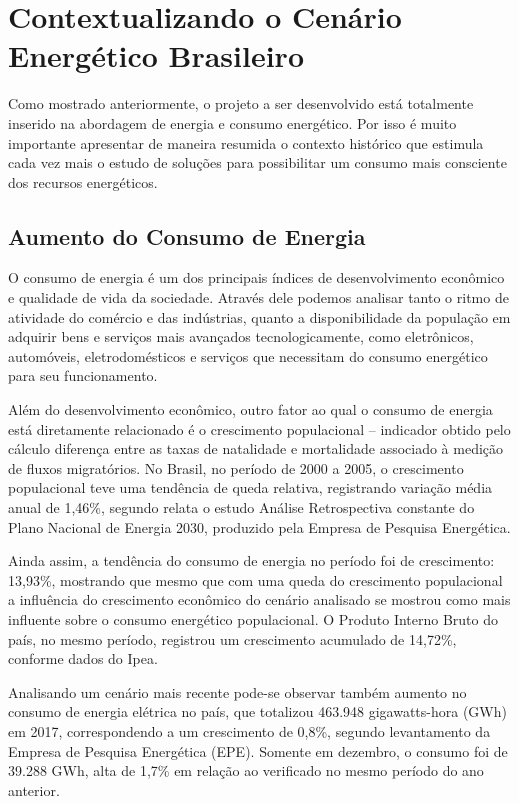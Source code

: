 \chapter{Contextualizando o Cenário Energético Brasileiro}
\label{c:contextualizando_o_cenario_energetico_brasileiro}

Como mostrado anteriormente, o projeto a ser desenvolvido está totalmente inserido
na abordagem de energia e consumo energético. Por isso é muito importante apresentar de maneira resumida o contexto histórico que estimula cada vez mais o estudo de soluções para possibilitar um consumo mais consciente dos recursos energéticos. 

\section{Aumento do Consumo de Energia}
O consumo de energia é um dos principais índices de
desenvolvimento econômico e qualidade de vida
da sociedade. Através dele podemos analisar tanto o ritmo de atividade
do comércio e das indústrias, quanto a
disponibilidade da população em adquirir bens e serviços
mais avançados tecnologicamente, como eletrônicos, automóveis, eletrodomésticos e serviços que necessitam do consumo energético para seu funcionamento.

Além do desenvolvimento econômico, outro fator ao qual o consumo de energia está diretamente relacionado é o crescimento populacional – indicador obtido pelo cálculo diferença entre as taxas de natalidade e mortalidade associado à medição de fluxos migratórios. No Brasil, no período de 2000 a 2005, o crescimento populacional teve uma tendência de queda relativa, registrando variação média anual de 1,46\%, segundo relata o estudo Análise Retrospectiva constante do Plano Nacional de Energia 2030, produzido pela Empresa de Pesquisa Energética.

Ainda assim, a tendência do consumo de energia no período foi de crescimento: 13,93\%, mostrando que mesmo que com uma queda do crescimento populacional a influência do crescimento econômico do cenário analisado se mostrou como mais influente sobre o consumo energético populacional. O Produto Interno Bruto do país, no mesmo período, registrou um
crescimento acumulado de 14,72\%, conforme dados do Ipea.

Analisando um cenário mais recente pode-se observar também aumento no consumo de energia elétrica no país, que totalizou 463.948 gigawatts-hora (GWh) em 2017, correspondendo a um crescimento de 0,8\%, segundo levantamento da Empresa de Pesquisa Energética (EPE). Somente em dezembro, o consumo foi de 39.288 GWh, alta de 1,7\% em relação ao verificado no mesmo período do ano anterior. \cite{atlasenergetico}


